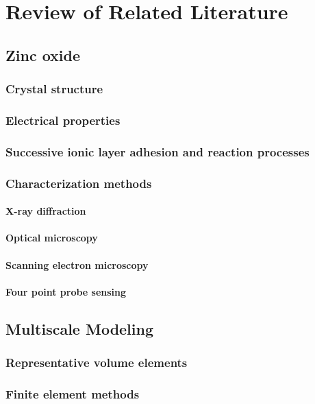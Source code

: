 \chapter{Review of Related Literature}

\section{Zinc oxide}

\subsection{Crystal structure}
\subsection{Electrical properties}
\subsection{Successive ionic layer adhesion and reaction processes}
\subsection{Characterization methods}
\subsubsection{X-ray diffraction}
\subsubsection{Optical microscopy}
\subsubsection{Scanning electron microscopy}
\subsubsection{Four point probe sensing}

\section{Multiscale Modeling}

\subsection{Representative volume elements}
\subsection{Finite element methods}
